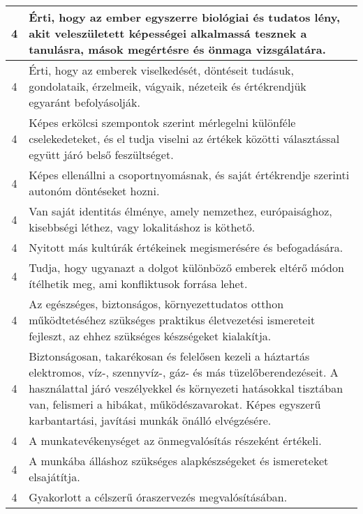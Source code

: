 \begin{longtable}{c | p{12cm} }
                                
                                          4 &  Érti, hogy az ember egyszerre biológiai és tudatos lény, akit veleszületett képességei alkalmassá tesznek a tanulásra, mások megértésre és önmaga vizsgálatára. \\ \hline
                                          4 &  Érti, hogy az emberek viselkedését, döntéseit tudásuk, gondolataik, érzelmeik, vágyaik, nézeteik és értékrendjük egyaránt befolyásolják. \\ \hline
                                          4 &  Képes erkölcsi szempontok szerint mérlegelni különféle cselekedeteket, és el tudja viselni az értékek közötti választással együtt járó belső feszültséget. \\ \hline
                                          4 &  Képes ellenállni a csoportnyomásnak, és saját értékrendje szerinti autonóm döntéseket hozni. \\ \hline
                                          4 &  Van saját identitás élménye, amely nemzethez, európaisághoz, kisebbségi léthez, vagy lokalitáshoz is köthető. \\ \hline
                                          4 &  Nyitott más kultúrák értékeinek megismerésére és befogadására. \\ \hline
                                          4 &  Tudja, hogy ugyanazt a dolgot különböző emberek eltérő módon ítélhetik meg, ami konfliktusok forrása lehet. \\ \hline
                                          4 &  Az egészséges, biztonságos, környezettudatos otthon működtetéséhez szükséges praktikus életvezetési ismereteit fejleszt, az ehhez szükséges készségeket kialakítja. \\ \hline
                                          4 &  Biztonságosan, takarékosan és felelősen kezeli a háztartás elektromos, víz-, szennyvíz-, gáz- és más tüzelőberendezéseit. A használattal járó veszélyekkel és környezeti hatásokkal tisztában van, felismeri a hibákat, működészavarokat. Képes egyszerű karbantartási, javítási munkák önálló elvégzésére. \\ \hline
                                          4 &  A munkatevékenységet az önmegvalósítás részeként értékeli. \\ \hline
                                          4 &  A munkába álláshoz szükséges alapkészségeket és ismereteket elsajátítja. \\ \hline
                                          4 &  Gyakorlott a célszerű óraszervezés megvalósításában. \\ \hline

\end{longtable}
